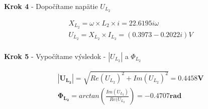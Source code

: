 \begin{center}
    \textbf{Krok 4} - Dopočítame napätie $U_{L_{2}}$
\end{center}

\begin{gather*}
    X_{L_{2}} = \omega \times L_{2} \times i = 22.6195i\omega\\
    U_{L_{2}} = X_{L_{2}} \times I_{L_{2}} = (0.3973 - 0.2022i)V\\
\end{gather*}


\begin{center}
    \textbf{Krok 5} - Vypočítame výsledok - $|U_{L_{2}}|$ a $\Phi_{L_{2}}$
\end{center} 

\begin{gather*}
    \boldsymbol{|U_{L_{2}}|} = \sqrt{Re(U_{L_{2}})^{2} + Im(U_{L_{2}})^{2}}=\boldsymbol{0.4458V}\\
    \boldsymbol{\Phi_{L_{2}}} = arctan(\frac{Im(U_{L_{2}})}{Re(U_{L_{2}}}) = \boldsymbol{-0.4707rad}\\
\end{gather*}

